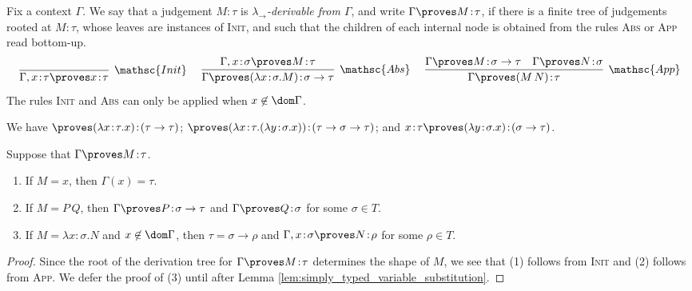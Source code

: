 \documentclass[reqno]{amsart}
\begin{document}
    \begin{definition}
        Fix a context $\Gamma$. We say that a judgement $M\!:\!\tau$ is \textit{$\lambda_\rightarrow$-derivable from $\Gamma$}, and write $\Gamma\proves M\!:\!\tau$, if there is a finite tree of judgements rooted at $M\!:\!\tau$, whose leaves are instances of \textsc{Init}, and such that the children of each internal node is obtained from the rules \textsc{Abs} or \textsc{App} read bottom-up.
        \begin{equation*}
            \infer[\mathsc{Init}]{\Gamma,x\!:\!\tau\proves x\!:\!\tau}{}\ \ \ \ 
            \infer[\mathsc{Abs}]{\Gamma\proves(\lambda x\!:\!\sigma.M)\!:\!\sigma\rightarrow\tau}{\Gamma,x\!:\!\sigma\proves M\!:\!\tau}\ \ \ \ 
            \infer[\mathsc{App}]{\Gamma\proves(M\,N)\!:\!\tau}{
                \Gamma\proves M\!:\!\sigma\rightarrow\tau &
                \Gamma\proves N\!:\!\sigma
            }
        \end{equation*}
        The rules \textsc{Init} and \textsc{Abs} can only be applied when $x\not\in\dom\Gamma$.
    \end{definition}

    \begin{example}
        We have $\proves(\lambda x\!:\!\tau.x)\!:\!(\tau\rightarrow\tau)$; $\proves(\lambda x\!:\!\tau.(\lambda y\!:\!\sigma.x))\!:\!(\tau\rightarrow\sigma\rightarrow\tau)$; and $x\!:\!\tau\proves(\lambda y\!:\!\sigma.x)\!:\!(\sigma\rightarrow\tau)$.
    \end{example}

    \begin{lemma}\label{lem:simply_typed_generation}
        Suppose that $\Gamma\proves M\!:\!\tau$.
        \begin{enumerate}
            \item If $M=x$, then $\Gamma(x)=\tau$.
            \item If $M=P\,Q$, then $\Gamma\proves P\!:\!\sigma\rightarrow\tau$ and $\Gamma\proves Q\!:\!\sigma$ for some $\sigma\in T$.
            \item If $M=\lambda x\!:\!\sigma.N$ and $x\not\in\dom\Gamma$, then $\tau=\sigma\rightarrow\rho$ and $\Gamma,x\!:\!\sigma\proves N\!:\!\rho$ for some $\rho\in T$.
        \end{enumerate}
    \end{lemma}
    \begin{proof}
        Since the root of the derivation tree for $\Gamma\proves M\!:\!\tau$ determines the shape of $M$, we see that (1) follows from \textsc{Init} and (2) follows from \textsc{App}. We defer the proof of (3) until after Lemma \ref{lem:simply_typed_variable_substitution}.\qedlem
    \end{proof}
\end{document}
